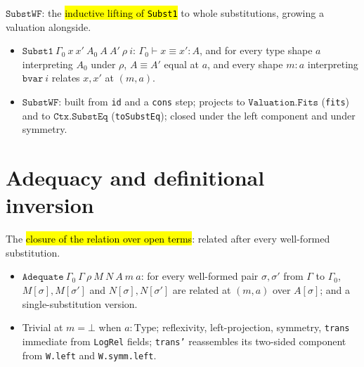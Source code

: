 \begin{definition}
\label{def:expa-lr-substwf}
\leanok
{}

 $\mathtt{SubstWF}$: the \hl{inductive lifting of \texttt{Subst1}} to whole
substitutions, growing a valuation alongside.
\begin{itemize}
\item $\mathtt{Subst1}\ \Gamma_0\ x\ x'\ A_0\ A\ A'\ \rho\ i$: $\Gamma_0\vdash x\equiv x':A$, and for
every type shape $a$ interpreting $A_0$ under $\rho$, $A\equiv A'$ equal at $a$, and every shape
$m:a$ interpreting $\mathtt{bvar}\ i$ relates $x,x'$ at $(m,a)$.
\item $\mathtt{SubstWF}$: built from \texttt{id} and a \texttt{cons} step; projects to
$\mathtt{Valuation.Fits}$ (\texttt{fits}) and to $\mathtt{Ctx.SubstEq}$ (\texttt{toSubstEq}); closed
under the left component and under symmetry.
\end{itemize}
\end{definition}

\section{Adequacy and definitional inversion}

\begin{definition}
\label{def:expa-lr-adequate}
\leanok
{}
 The \hl{closure of the relation over open terms}: related after every well-formed
substitution.
\begin{itemize}
\item $\mathtt{Adequate}\ \Gamma_0\ \Gamma\ \rho\ M\ N\ A\ m\ a$: for every well-formed pair
$\sigma,\sigma'$ from $\Gamma$ to $\Gamma_0$, $M[\sigma],M[\sigma']$ and $N[\sigma],N[\sigma']$ are
related at $(m,a)$ over $A[\sigma]$; and a single-substitution version.
\item Trivial at $m=\bot$ when $a:\mathrm{Type}$; reflexivity, left-projection, symmetry,
\texttt{trans} immediate from \texttt{LogRel} fields; \texttt{trans'} reassembles its two-sided
component from \texttt{W.left} and \texttt{W.symm.left}.
\end{itemize}
\end{definition}

